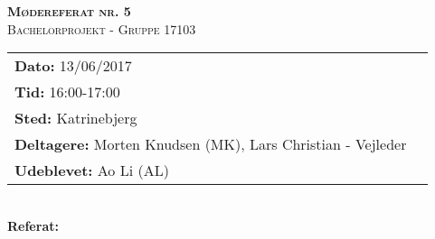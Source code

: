 
\newcommand{\HRule}{\rule{\linewidth}{0.1mm}}


	\begin{center}
		{\huge \bfseries \textsc{Mødereferat nr. 5}}\\
		\textsc{\large Bachelorprojekt - Gruppe 17103}\\[0.3cm]
	\end{center}
	\begin{tabular}{ll}
	\large \textbf{Dato:} 13/06/2017  	\\ %
	\large \textbf{Tid:}  16:00-17:00 	\\ %
	\large \textbf{Sted:} Katrinebjerg		\\ %
	\large \textbf{Deltagere:} Morten Knudsen (MK), Lars Christian - Vejleder \\
	\large \textbf{Udeblevet:} Ao Li (AL)
	\end{tabular}\\
	\phantom{\,}\hspace{0.1em} \large \textbf{Referat:}
